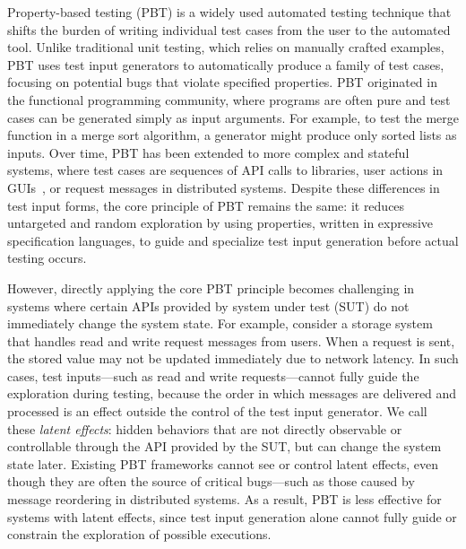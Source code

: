 Property-based testing (PBT) is a widely used automated testing technique that shifts the burden of writing individual test cases from the user to the automated tool. Unlike traditional unit testing, which relies on manually crafted examples, PBT uses test input generators to automatically produce a family of test cases, focusing on potential bugs that violate specified properties. PBT originated in the functional programming community, where programs are often pure and test cases can be generated simply as input arguments. For example, to test the merge function in a merge sort algorithm, a generator might produce only sorted lists as inputs. 
Over time, PBT has been extended to more complex and stateful systems, where test cases are sequences of API calls to libraries, user actions in GUIs~\cite{Quickstrom}, or request messages in distributed systems.
Despite these differences in test input forms, the core principle of PBT remains the same: it reduces untargeted and random exploration by using properties, written in expressive specification languages, to guide and specialize test input generation before actual testing occurs.

However, directly applying the core PBT principle becomes challenging in systems where certain APIs provided by system under test (SUT) do not immediately change the system state. For example, consider a storage system that handles read and write request messages from users. When a request is sent, the stored value may not be updated immediately due to network latency. In such cases, test inputs—such as read and write requests—cannot fully guide the exploration during testing, because the order in which messages are delivered and processed is an effect outside the control of the test input generator.
We call these \emph{latent effects}: hidden behaviors that are not directly observable or controllable through the API provided by the SUT, but can change the system state later. Existing PBT frameworks cannot see or control latent effects, even though they are often the source of critical bugs—such as those caused by message reordering in distributed systems. As a result, PBT is less effective for systems with latent effects, since test input generation alone cannot fully guide or constrain the exploration of possible executions.

